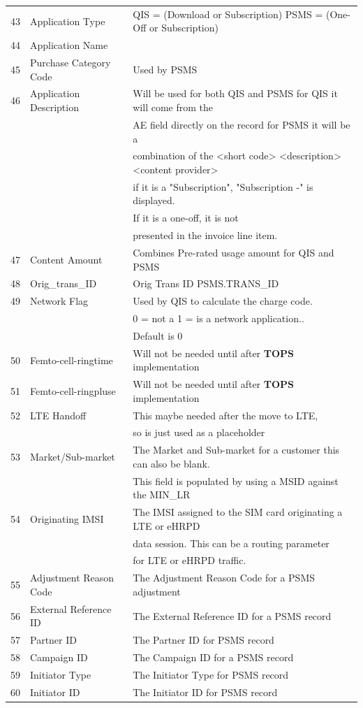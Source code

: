 \documentclass[12pt,twoside]{article}
\begin{document}
\begin{longtable}{c|l|l}
43 & Application Type & QIS = (Download or Subscription) PSMS = (One-Off or Subscription)\\
44 & Application Name & \\
45 & Purchase Category Code & Used by PSMS\\
46 & Application Description & Will be used for both QIS and PSMS for QIS it will come from the\\
 &  & AE field directly on the record for PSMS it will be a\\
 &  & combination of the <short code> <description> <content provider>\\
 &  & if it is a "Subscription", "Subscription -" is displayed.\\
 &  & If it is a one-off, it is not\\
 &  & presented in the invoice line item.\\
47 & Content Amount & Combines Pre-rated usage amount for QIS and PSMS\\
48 & Orig\_trans\_ID & Orig Trans ID PSMS.TRANS\_ID\\
49 & Network Flag & Used by QIS to calculate the charge code.\\
 &  & 0 = not a 1 = is a network application..\\
 &  & Default is 0\\
50 & Femto-cell-ringtime & Will not be needed until after \textbf{TOPS} implementation\\
51 & Femto-cell-ringpluse & Will not be needed until after \textbf{TOPS} implementation\\
52 & LTE Handoff & This maybe needed after the move to LTE,\\
 &  & so is just used as a placeholder\\
53 & Market/Sub-market & The Market and Sub-market for a customer this can also be blank.\\
 &  & This field is populated by using a MSID against the MIN\_LR\\
54 & Originating IMSI & The IMSI assigned to the SIM card originating a LTE or eHRPD\\
 &  & data session. This can be a routing parameter\\
 &  & for LTE or eHRPD traffic.\\
55 & Adjustment Reason Code & The Adjustment Reason Code for a PSMS adjustment\\
56 & External Reference ID & The External Reference ID for a PSMS record\\
57 & Partner ID & The Partner ID for PSMS record\\
58 & Campaign ID & The Campaign ID for a PSMS record\\
59 & Initiator Type & The Initiator Type for PSMS record\\
60 & Initiator ID & The Initiator ID for PSMS record\\
\hline
\end{longtable}
\normalsize
\end{document}
